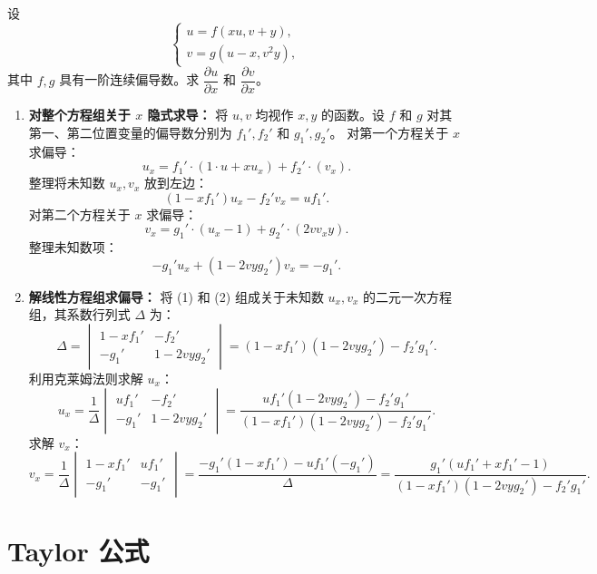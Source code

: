 \documentclass[lang=cn,11pt]{elegantbook}
\begin{document}
\begin{exercise}[抽象方程组隐函数求导]
设 
\[
\begin{cases} 
u = f(xu, v+y), \\ 
v = g(u-x, v^2y), 
\end{cases}
\]
其中 $f,g$ 具有一阶连续偏导数。求 $\dfrac{\partial u}{\partial x}$ 和 $\dfrac{\partial v}{\partial x}$。
\end{exercise}
\begin{solution}
\begin{enumerate}
  \item \textbf{对整个方程组关于 $x$ 隐式求导：}
  将 $u,v$ 均视作 $x,y$ 的函数。设 $f$ 和 $g$ 对其第一、第二位置变量的偏导数分别为 $f_1', f_2'$ 和 $g_1', g_2'$。
  对第一个方程关于 $x$ 求偏导：
  \[ u_x = f_1' \cdot (1\cdot u + x u_x) + f_2' \cdot (v_x). \]
  整理将未知数 $u_x, v_x$ 放到左边：
  \[ (1 - x f_1')u_x - f_2' v_x = u f_1'. \tag{1} \]
  对第二个方程关于 $x$ 求偏导：
  \[ v_x = g_1' \cdot (u_x - 1) + g_2' \cdot (2v v_x y). \]
  整理未知数项：
  \[ -g_1' u_x + (1 - 2vy g_2')v_x = -g_1'. \tag{2} \]
  \item \textbf{解线性方程组求偏导：}
  将 (1) 和 (2) 组成关于未知数 $u_x, v_x$ 的二元一次方程组，其系数行列式 $\Delta$ 为：
  \[ \Delta = \begin{vmatrix} 1-x f_1' & -f_2' \\ -g_1' & 1-2vy g_2' \end{vmatrix} = (1-x f_1')(1-2vy g_2') - f_2' g_1'. \]
  利用克莱姆法则求解 $u_x$：
  \[ u_x = \frac{1}{\Delta} \begin{vmatrix} u f_1' & -f_2' \\ -g_1' & 1-2vy g_2' \end{vmatrix} = \frac{u f_1'(1-2vy g_2') - f_2' g_1'}{(1-x f_1')(1-2vy g_2') - f_2' g_1'}. \]
  求解 $v_x$：
  \[ v_x = \frac{1}{\Delta} \begin{vmatrix} 1-x f_1' & u f_1' \\ -g_1' & -g_1' \end{vmatrix} = \frac{-g_1'(1-x f_1') - u f_1'(-g_1')}{\Delta} = \frac{g_1'(u f_1' + x f_1' - 1)}{(1-x f_1')(1-2vy g_2') - f_2' g_1'}. \]
\end{enumerate}
\end{solution}



\section{Taylor 公式}
\end{document}
